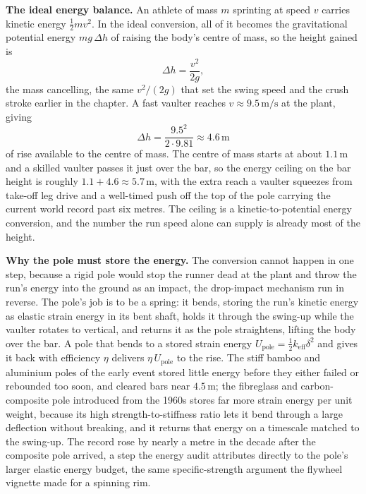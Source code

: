 \textbf{The ideal energy balance.} An athlete of mass $m$ sprinting at speed
$v$ carries kinetic energy $\tfrac12 m v^2$. In the ideal conversion, all of
it becomes the gravitational potential energy $mg\,\Delta h$ of raising the
body's centre of mass, so the height gained is
\[
\Delta h = \frac{v^2}{2g},
\]
the mass cancelling, the same $v^2/(2g)$ that set the swing speed and the
crush stroke earlier in the chapter. A fast vaulter reaches $v \approx
9.5\,\si{\meter\per\second}$ at the plant, giving
\[
\Delta h = \frac{9.5^2}{2\cdot 9.81} \approx 4.6\,\si{\meter}
\]
of rise available to the centre of mass. The centre of mass starts at about
$1.1\,\si{\meter}$ and a skilled vaulter passes it just over the bar, so the
energy ceiling on the bar height is roughly $1.1 + 4.6 \approx
5.7\,\si{\meter}$, with the extra reach a vaulter squeezes from take-off leg
drive and a well-timed push off the top of the pole carrying the current
world record past six metres. The ceiling is a kinetic-to-potential energy
conversion, and the number the run speed alone can supply is already most of
the height.

\textbf{Why the pole must store the energy.} The conversion cannot happen in
one step, because a rigid pole would stop the runner dead at the plant and
throw the run's energy into the ground as an impact, the drop-impact
mechanism run in reverse. The pole's job is to be a spring: it bends, storing
the run's kinetic energy as elastic strain energy in its bent shaft, holds it
through the swing-up while the vaulter rotates to vertical, and returns it as
the pole straightens, lifting the body over the bar. A pole that bends to a
stored strain energy $U_{\mathrm{pole}} = \tfrac12 k_{\mathrm{eff}}
\delta^2$ and gives it back with efficiency $\eta$ delivers $\eta\,
U_{\mathrm{pole}}$ to the rise. The stiff bamboo and aluminium poles of the
early event stored little energy before they either failed or rebounded too
soon, and cleared bars near $4.5\,\si{\meter}$; the fibreglass and
carbon-composite pole introduced from the 1960s stores far more strain
energy per unit weight, because its high strength-to-stiffness ratio lets it
bend through a large deflection without breaking, and it returns that energy
on a timescale matched to the swing-up. The record rose by nearly a metre in
the decade after the composite pole arrived, a step the energy audit
attributes directly to the pole's larger elastic energy budget, the same
specific-strength argument the flywheel vignette made for a spinning rim.

